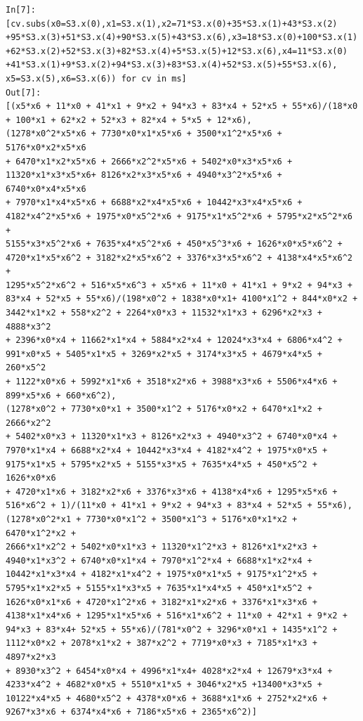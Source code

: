 \documentclass[12pt,a4paper]{article}
\begin{document}
\begin{verbatim}
In[7]:
[cv.subs(x0=S3.x(0),x1=S3.x(1),x2=71*S3.x(0)+35*S3.x(1)+43*S3.x(2)
+95*S3.x(3)+51*S3.x(4)+90*S3.x(5)+43*S3.x(6),x3=18*S3.x(0)+100*S3.x(1)
+62*S3.x(2)+52*S3.x(3)+82*S3.x(4)+5*S3.x(5)+12*S3.x(6),x4=11*S3.x(0)
+41*S3.x(1)+9*S3.x(2)+94*S3.x(3)+83*S3.x(4)+52*S3.x(5)+55*S3.x(6),
x5=S3.x(5),x6=S3.x(6)) for cv in ms]
Out[7]:
[(x5*x6 + 11*x0 + 41*x1 + 9*x2 + 94*x3 + 83*x4 + 52*x5 + 55*x6)/(18*x0 
+ 100*x1 + 62*x2 + 52*x3 + 82*x4 + 5*x5 + 12*x6),
(1278*x0^2*x5*x6 + 7730*x0*x1*x5*x6 + 3500*x1^2*x5*x6 + 5176*x0*x2*x5*x6 
+ 6470*x1*x2*x5*x6 + 2666*x2^2*x5*x6 + 5402*x0*x3*x5*x6 +
11320*x1*x3*x5*x6+ 8126*x2*x3*x5*x6 + 4940*x3^2*x5*x6 + 6740*x0*x4*x5*x6
+ 7970*x1*x4*x5*x6 + 6688*x2*x4*x5*x6 + 10442*x3*x4*x5*x6 + 
4182*x4^2*x5*x6 + 1975*x0*x5^2*x6 + 9175*x1*x5^2*x6 + 5795*x2*x5^2*x6 + 
5155*x3*x5^2*x6 + 7635*x4*x5^2*x6 + 450*x5^3*x6 + 1626*x0*x5*x6^2 + 
4720*x1*x5*x6^2 + 3182*x2*x5*x6^2 + 3376*x3*x5*x6^2 + 4138*x4*x5*x6^2 + 
1295*x5^2*x6^2 + 516*x5*x6^3 + x5*x6 + 11*x0 + 41*x1 + 9*x2 + 94*x3 + 
83*x4 + 52*x5 + 55*x6)/(198*x0^2 + 1838*x0*x1+ 4100*x1^2 + 844*x0*x2 + 
3442*x1*x2 + 558*x2^2 + 2264*x0*x3 + 11532*x1*x3 + 6296*x2*x3 + 4888*x3^2 
+ 2396*x0*x4 + 11662*x1*x4 + 5884*x2*x4 + 12024*x3*x4 + 6806*x4^2 + 
991*x0*x5 + 5405*x1*x5 + 3269*x2*x5 + 3174*x3*x5 + 4679*x4*x5 + 260*x5^2 
+ 1122*x0*x6 + 5992*x1*x6 + 3518*x2*x6 + 3988*x3*x6 + 5506*x4*x6 + 
899*x5*x6 + 660*x6^2),
(1278*x0^2 + 7730*x0*x1 + 3500*x1^2 + 5176*x0*x2 + 6470*x1*x2 + 2666*x2^2
+ 5402*x0*x3 + 11320*x1*x3 + 8126*x2*x3 + 4940*x3^2 + 6740*x0*x4 + 
7970*x1*x4 + 6688*x2*x4 + 10442*x3*x4 + 4182*x4^2 + 1975*x0*x5 + 
9175*x1*x5 + 5795*x2*x5 + 5155*x3*x5 + 7635*x4*x5 + 450*x5^2 + 1626*x0*x6 
+ 4720*x1*x6 + 3182*x2*x6 + 3376*x3*x6 + 4138*x4*x6 + 1295*x5*x6 + 
516*x6^2 + 1)/(11*x0 + 41*x1 + 9*x2 + 94*x3 + 83*x4 + 52*x5 + 55*x6),
(1278*x0^2*x1 + 7730*x0*x1^2 + 3500*x1^3 + 5176*x0*x1*x2 + 6470*x1^2*x2 + 
2666*x1*x2^2 + 5402*x0*x1*x3 + 11320*x1^2*x3 + 8126*x1*x2*x3 + 
4940*x1*x3^2 + 6740*x0*x1*x4 + 7970*x1^2*x4 + 6688*x1*x2*x4 + 
10442*x1*x3*x4 + 4182*x1*x4^2 + 1975*x0*x1*x5 + 9175*x1^2*x5 + 
5795*x1*x2*x5 + 5155*x1*x3*x5 + 7635*x1*x4*x5 + 450*x1*x5^2 + 
1626*x0*x1*x6 + 4720*x1^2*x6 + 3182*x1*x2*x6 + 3376*x1*x3*x6 + 
4138*x1*x4*x6 + 1295*x1*x5*x6 + 516*x1*x6^2 + 11*x0 + 42*x1 + 9*x2 + 
94*x3 + 83*x4+ 52*x5 + 55*x6)/(781*x0^2 + 3296*x0*x1 + 1435*x1^2 + 
1112*x0*x2 + 2078*x1*x2 + 387*x2^2 + 7719*x0*x3 + 7185*x1*x3 + 4897*x2*x3 
+ 8930*x3^2 + 6454*x0*x4 + 4996*x1*x4+ 4028*x2*x4 + 12679*x3*x4 + 
4233*x4^2 + 4682*x0*x5 + 5510*x1*x5 + 3046*x2*x5 +13400*x3*x5 + 
10122*x4*x5 + 4680*x5^2 + 4378*x0*x6 + 3688*x1*x6 + 2752*x2*x6 + 
9267*x3*x6 + 6374*x4*x6 + 7186*x5*x6 + 2365*x6^2)]
\end{verbatim}
\end{document}
